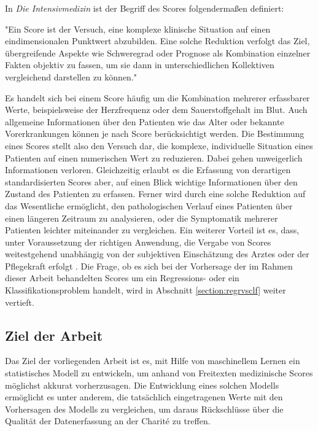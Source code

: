In \textit{Die Intensivmedizin} \citep{marxIntensivmedizin2015c} ist der Begriff des Scores folgendermaßen definiert:

\begin{itquote}
    "Ein Score ist der Versuch, eine komplexe klinische Situation auf einen eindimensionalen Punktwert abzubilden. Eine solche Reduktion verfolgt das Ziel, übergreifende Aspekte wie Schweregrad oder Prognose als Kombination einzelner Fakten objektiv zu fassen, um sie dann in unterschiedlichen Kollektiven vergleichend darstellen zu können."
\end{itquote}

Es handelt sich bei einem Score häufig um die Kombination mehrerer erfassbarer Werte, beispielsweise der Herzfrequenz oder dem Sauerstoffgehalt im Blut. Auch allgemeine Informationen über den Patienten wie das Alter oder bekannte Vorerkrankungen können je nach Score berücksichtigt werden. Die Bestimmung eines Scores stellt also den Versuch dar, die komplexe, individuelle Situation eines Patienten auf einen numerischen Wert zu reduzieren. Dabei gehen unweigerlich Informationen verloren. Gleichzeitig erlaubt es die Erfassung von derartigen standardisierten Scores aber, auf einen Blick wichtige Informationen über den Zustand des Patienten zu erfassen. Ferner wird durch eine solche Reduktion auf das Wesentliche ermöglicht, den pathologischen Verlauf eines Patienten über einen längeren Zeitraum zu analysieren, oder die Symptomatik mehrerer Patienten leichter miteinander zu vergleichen. Ein weiterer Vorteil ist es, dass, unter Voraussetzung der richtigen Anwendung, die Vergabe von Scores weitestgehend unabhängig von der subjektiven Einschätzung des Arztes oder der Pflegekraft erfolgt \citep{marxIntensivmedizin2015c}.
Die Frage, ob es sich bei der Vorhersage der im Rahmen dieser Arbeit behandelten Scores um ein Regressions- oder ein Klassifikationsproblem handelt, wird in Abschnitt \ref{section:regrvsclf} weiter vertieft. 

\subsection{Ziel der Arbeit}
Das Ziel der vorliegenden Arbeit ist es, mit Hilfe von maschinellem Lernen ein statistisches Modell zu entwickeln, um anhand von Freitexten medizinische Scores möglichst akkurat vorherzusagen. Die Entwicklung eines solchen Modells ermöglicht es unter anderem, die tatsächlich eingetragenen Werte mit den Vorhersagen des Modells zu vergleichen, um daraus Rückschlüsse über die Qualität der Datenerfassung an der Charité zu treffen.


